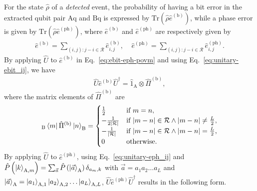 \documentclass[twocolumn,superscriptaddress,pra,footinbib,notitlepage]{revtex4-1}
\newcommand{\tr}[1]{\mathrm{Tr}\left(#1\right)}
\newcommand{\1}{\mbox{1}\hspace{-0.25em}\mbox{l}}
\newcommand{\abs}[1]{\lvert#1\rvert}
\begin{document}
For the state $\hat{\rho}$ of a \textit{detected} event, the probability of having a bit error in the extracted qubit pair $\textrm{Aq}$ and $\textrm{Bq}$ is expressed by $\tr{\hat{\rho}\hat{e}^{(\textrm{b})}}$, while a phase error is given by $\tr{\hat{\rho}\hat{e}^{(\textrm{ph})}}$, where $\hat{e}^{(\textrm{b})}$ and $\hat{e}^{(\textrm{ph})}$ are respectively given by 
\begin{align}
\hat{e}^{(\textrm{b})}=\sum_{(i, j):j-i\in\mathcal{R}}\hat{e}^{(\textrm{b})}_{i, j},~~~~~\hat{e}^{(\textrm{ph})}=\sum_{(i, j):j-i\in\mathcal{R}}\hat{e}_{i, j}^{(\textrm{ph})}.\label{eq:ebit-eph-povm}
\end{align}
By applying $\hat{U}$ to $\hat{e}^{(\textrm{b})}$ in Eq.~\eqref{eq:ebit-eph-povm} and using Eq.~\eqref{eq:unitary-ebit_ij}, we have
\begin{align}
\hat{U}\hat{e}^{(\textrm{b})}\hat{U}^\dagger=\hat{1}_\textrm{A}\otimes\hat{\Pi}^{(\textrm{b})},\label{eq:unitary-ebit}
\end{align}
where the matrix elements of $\hat{\Pi}^{(\textrm{b})}$ are
\begin{align}
{}_\textrm{B}\bra{m}\hat{\Pi}^{(\textrm{b})}\ket{n}_\textrm{B}=
\begin{cases}
\frac{1}{2}&\textrm{if } m=n,\\
-\frac{1}{2\abs{\mathcal{R}}}&\textrm{if } \abs{m-n}\in\mathcal{R}\wedge\abs{m-n}\neq\frac{L}{2},\\
-\frac{1}{\abs{\mathcal{R}}}&\textrm{if } \abs{m-n}\in\mathcal{R}\wedge\abs{m-n}=\frac{L}{2},\\
0&\textrm{otherwise}.
\end{cases}\label{eq:Pi}
\end{align}
By applying $\hat{U}$ to $\hat{e}^{(\textrm{ph})}$, using Eq.~\eqref{eq:unitary-eph_ij} and $\hat{P}\left(\ket{k}_{\textrm{A}, m}\right)=\sum_{\vec{a}}\hat{P}\left(\ket{\vec{a}}_\textrm{A}\right)\delta_{a_m, k}$ with $\vec{a}=a_1a_2\dots a_L$ and $\ket{\vec{a}}_\textrm{A}=\ket{a_1}_{\textrm{A}, 1}\ket{a_2}_{\textrm{A}, 2}\dots\ket{a_L}_{\textrm{A}, L}$, $\hat{U}\hat{e}^{(\textrm{ph})}\hat{U}^\dagger$ results in the following form.
\end{document}
